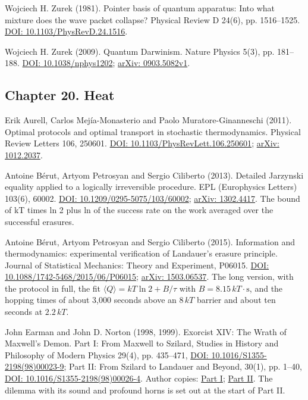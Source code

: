 \documentclass[11pt,twoside]{article}
\theoremstyle{thielethm}
\theoremstyle{thieledef}
\theoremstyle{thieledef}
\theoremstyle{thieledef}
\theoremstyle{thielethm}
\theoremstyle{thieleobs}
\theoremstyle{thielethm}
\begin{document}
\noindent Wojciech H. Zurek (1981). Pointer basis of quantum apparatus: Into what mixture does the wave packet collapse? Physical Review D 24(6), pp. 1516--1525. \href{https://doi.org/10.1103/PhysRevD.24.1516}{DOI: 10.1103/PhysRevD.24.1516}.
\par\medskip

\noindent Wojciech H. Zurek (2009). Quantum Darwinism. Nature Physics 5(3), pp. 181--188. \href{https://doi.org/10.1038/nphys1202}{DOI: 10.1038/nphys1202}; \href{https://arxiv.org/abs/0903.5082v1}{arXiv: 0903.5082v1}.
\par\medskip

\subsection*{Chapter 20. Heat}

\noindent Erik Aurell, Carlos Mej\'ia-Monasterio and Paolo Muratore-Ginanneschi (2011). Optimal protocols and optimal transport in stochastic thermodynamics. Physical Review Letters 106, 250601. \href{https://doi.org/10.1103/PhysRevLett.106.250601}{DOI: 10.1103/PhysRevLett.106.250601}; \href{https://arxiv.org/abs/1012.2037}{arXiv: 1012.2037}.
\par\medskip

\noindent Antoine B\'erut, Artyom Petrosyan and Sergio Ciliberto (2013). Detailed Jarzynski equality applied to a logically irreversible procedure. EPL (Europhysics Letters) 103(6), 60002. \href{https://doi.org/10.1209/0295-5075/103/60002}{DOI: 10.1209/0295-5075/103/60002}; \href{https://arxiv.org/abs/1302.4417}{arXiv: 1302.4417}. The bound of kT times ln 2 plus ln of the success rate on the work averaged over the successful erasures.
\par\medskip

\noindent Antoine B\'erut, Artyom Petrosyan and Sergio Ciliberto (2015). Information and thermodynamics: experimental verification of Landauer's erasure principle. Journal of Statistical Mechanics: Theory and Experiment, P06015. \href{https://doi.org/10.1088/1742-5468/2015/06/P06015}{DOI: 10.1088/1742-5468/2015/06/P06015}; \href{https://arxiv.org/abs/1503.06537}{arXiv: 1503.06537}. The long version, with the protocol in full, the fit $\langle Q\rangle = kT\ln 2 + B/\tau$ with $B = 8.15\,kT\cdot\mathrm{s}$, and the hopping times of about 3,000 seconds above an $8\,kT$ barrier and about ten seconds at $2.2\,kT$.
\par\medskip

\noindent John Earman and John D. Norton (1998, 1999). Exorcist XIV: The Wrath of Maxwell's Demon. Part I: From Maxwell to Szilard, Studies in History and Philosophy of Modern Physics 29(4), pp. 435--471, \href{https://doi.org/10.1016/S1355-2198(98)00023-9}{DOI: 10.1016/S1355-2198(98)00023-9}; Part II: From Szilard to Landauer and Beyond, 30(1), pp. 1--40, \href{https://doi.org/10.1016/S1355-2198(98)00026-4}{DOI: 10.1016/S1355-2198(98)00026-4}. Author copies: \href{https://sites.pitt.edu/~jdnorton/papers/ExorcistXIV/Exorcist1.pdf}{Part I}; \href{https://sites.pitt.edu/~jdnorton/papers/ExorcistXIV/Exorcist2.pdf}{Part II}. The dilemma with its sound and profound horns is set out at the start of Part II.
\par\medskip
\end{document}
